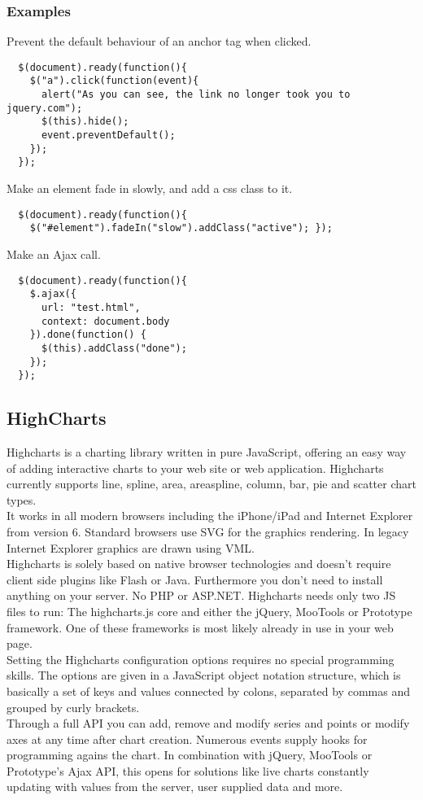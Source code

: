 \subsubsection{Examples}
Prevent the default behaviour of an anchor tag when clicked.
\begin{verbatim}
  $(document).ready(function(){
    $("a").click(function(event){
      alert("As you can see, the link no longer took you to jquery.com");
      $(this).hide();
      event.preventDefault();
    });
  });
\end{verbatim}
Make an element fade in slowly, and add a css class to it.
\begin{verbatim}
  $(document).ready(function(){
    $("#element").fadeIn("slow").addClass("active"); });
\end{verbatim}
Make an Ajax call.
\begin{verbatim}
  $(document).ready(function(){
    $.ajax({
      url: "test.html",
      context: document.body
    }).done(function() { 
      $(this).addClass("done");
    });
  });
\end{verbatim}
\subsection{HighCharts}
Highcharts is a charting library written in pure JavaScript, offering an easy way of adding interactive charts to 
your web site or web application. Highcharts currently supports line, spline, area, areaspline, column, bar, pie 
and scatter chart types.\\
It works in all modern browsers including the iPhone/iPad and Internet Explorer from version 6. Standard browsers 
use SVG for the graphics rendering. In legacy Internet Explorer graphics are drawn using VML.\\
Highcharts is solely based on native browser technologies and doesn't require client side plugins like Flash or Java. 
Furthermore you don't need to install anything on your server. No PHP or ASP.NET. Highcharts needs only two JS files 
to run: The highcharts.js core and either the jQuery, MooTools or Prototype framework. One of these frameworks is most 
likely already in use in your web page.\\
Setting the Highcharts configuration options requires no special programming skills. The options are given in a 
JavaScript object notation structure, which is basically a set of keys and values connected by colons, separated by 
commas and grouped by curly brackets.\\
Through a full API you can add, remove and modify series and points or modify axes at any time after chart creation. 
Numerous events supply hooks for programming agains the chart. In combination with jQuery, MooTools or Prototype's 
Ajax API, this opens for solutions like live charts constantly updating with values from the server, user supplied 
data and more.\\
\clearpage
